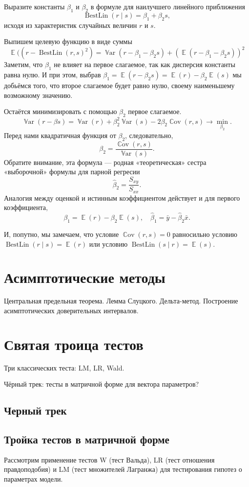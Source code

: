 \documentclass[12pt]{article}
\DeclareMathOperator{\Cov}{\mathbb{C}ov}
\DeclareMathOperator{\Var}{\mathbb{V}ar}
\DeclareMathOperator{\BestLin}{BestLin}
\DeclareMathOperator{\E}{\mathbb{E}}
\renewcommand{\b}{\beta}
\newcommand{\hb}{\hat{\beta}}
\newenvironment{sol}{}{}
\begin{document}
\begin{problem}
Выразите константы $\b_1$ и $\b_2$ в формуле для наилучшего линейного приближения 
\[
\BestLin(r \mid s) = \b_1 + \b_2 s,
\]
исходя из характеристик случайных величин $r$ и $s$. 

\begin{sol}
Выпишем целевую функцию в виде суммы
\[
    \E((r - \BestLin(r, s)^2)  = \Var(r - \b_1- \beta_2 s) + (\E(r - \b_1 - \b_2 s))^2
\]
Заметим, что $\b_1$ не влияет на первое слагаемое, так как дисперсия константы равна нулю.
И при этом, выбрав $\b_1 = \E(r - \b_2 s) = \E(r) - \b_2\E(s)$ мы добьёмся того, что второе слагаемое будет равно нулю, своему наименьшему возможному значению. 

Остаётся минимизировать с помощью $\b_2$ первое слагаемое. 
\[
\Var(r - \beta s) = \Var(r) + \b_2^2 \Var(s) - 2 \b_2 \Cov(r, s) \to \min_{\b_2}.
\]
Перед нами квадратичная функция от $\b_2$, следовательно, 
\[
\b_2 = \frac{\Cov(r, s)}{ \Var(s)}.
\]
Обратите внимание, эта формула — родная «теоретическая» сестра «выборочной» формулы для парной регресии
\[
\hat\beta_2 = \frac{S_{xy}}{S_{xx}}.
\]
Аналогия между оценкой и истинным коэффициентом действует и для первого коэффициента,
\[
\b_1 = \E(r) - \b_2 \E(s), \quad  \hb_1 = \bar y - \hb_2 \bar x.
\]

И, попутно, мы замечаем, что условие $\Cov(r, s) = 0$ равносильно условию  $\BestLin(r \mid s) = \E(r)$ или условию $\BestLin(s \mid r) = \E(s)$.
\end{sol}
\end{problem}



\section{Асимптотические методы}
Центральная предельная теорема. Лемма Слуцкого. Дельта-метод. Построение асимптотических доверительных интервалов.


\section{Святая троица тестов}
Три классических теста: LM, LR, Wald.


Чёрный трек: тесты в матричной форме для вектора параметров?
\subsection{Черный трек}
\subsection{Тройка тестов в матричной форме}
Рассмотрим применение тестов W  (тест Вальда), LR (тест отношения правдоподобия) и LM (тест множителей Лагранжа) для тестирования гипотез о параметрах модели.
\end{document}
